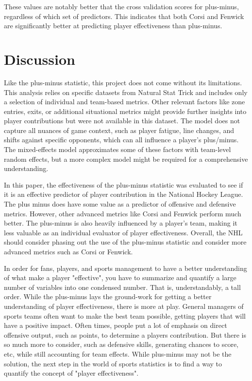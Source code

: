 \documentclass[12pt]{article}
\begin{document}
These values are notably better that the cross validation scores for plus-minus, regardless of which set of predictors. This indicates
that both Corsi and Fenwick are significantly better at predicting player effectiveness than plus-minus.


\section{Discussion}
\label{sec:disc}

Like the plus-minus statistic, this project does not come without its limitations. This analysis relies on specific datasets from 
Natural Stat Trick and includes only a selection of individual and team-based metrics. Other relevant factors like zone entries, exits, or 
additional situational metrics might provide further insights into player contributions but were not available in this dataset. The model 
does not capture all nuances of game context, such as player fatigue, line changes, and shifts against specific opponents, which can all 
influence a player’s plus/minus. The mixed-effects model approximates some of these factors with team-level random effects, but a more 
complex model might be required for a comprehensive understanding.

In this paper, the effectiveness of the plus-minus statistic was evaluated to see if it is an effective predictor of player contribution
in the National Hockey League. The plus minus does have some value as a predictor of offensive and defensive metrics. However, other
advanced metrics like Corsi and Fenwick perform much better. The plus-minus is also heavily influenced by a player's team, making it 
less valuable as an individual evaluator of player effectiveness. Overall, the NHL should consider phasing out the use of the plus-minus
statistic and consider more advanced metrics such as Corsi or Fenwick.

In order for fans, players, and sports management to have a better understanding of what make a player "effective", you have to 
summarize and quantify a large number of variables into one condensed number. That is, understandably, a tall order. While the plus-minus
lays the ground-work for getting a better understanding of player effectiveness, there is more at play. General managers of sports teams
often want to make the best team possible, getting players that will have a positive impact. Often times, people put a lot of emphasis on
direct offensive output, such as points, to determine a players contribution. But there is so much more to consider, such as defensive skills,
generating chances to score, etc, while still accounting for team effects. While plus-minus may not be the solution, the next step in the 
world of sports statistics is to find a way to quantify the concept of "player effectiveness".



\end{document}
